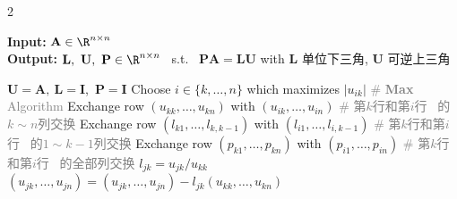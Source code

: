 \documentclass{note}
\newcommand{\codealg}[1]{\textcolor{gray}{\quad \# \textbf{#1} Algorithm}}
\begin{document}
\vspace{-27pt}

\begin{multicols}{2}

\begin{algorithm}[H]
\tiny
\caption*{\textbf{LUPP} LU factorisation with partial pivoting \ps{(not unique)} \vspace{-0.1cm} \quad \ps{$C(n)=\frac{2}{3}n^3+n^2-\frac{5}{3}n$}}
\textbf{Input:} $\mathbf{A}\in\R^{n\times n}$ \\
\textbf{Output:} $\mathbf{L},\ \mathbf{U},\ \mathbf{P}\in\R^{n\times n}$ \ s.t. \ $\mathbf{P}\mathbf{A}=\mathbf{L}\mathbf{U}$ with $\mathbf{L}$ 单位下三角, $\mathbf{U}$ 可逆上三角
\begin{algorithmic}[1]
  \State $\mathbf{U} = \mathbf{A},\ \mathbf{L} = \mathbf{I}$,\ $\mathbf{P} = \mathbf{I}$
    \State Choose $i\in\{k,\dots,n\}$ which maximizes $|u_{ik}|$ \codealg{Max}
    \State Exchange row $(u_{kk}, \dots, u_{kn})$ with $(u_{ik}, \dots, u_{in})$ \textcolor{gray}{\quad \# 第$k$行和第$i$行 \ 的$k\sim n$列交换}
    \State Exchange row $(l_{k1}, \dots, l_{k,k-1})$ with $(l_{i1}, \dots, l_{i,k-1})$ \textcolor{gray}{\quad \# 第$k$行和第$i$行 \ 的$1\sim k-1$列交换}
    \State Exchange row $(p_{k1}, \dots, p_{kn})$ with $(p_{i1}, \dots, p_{in})$ \textcolor{gray}{\quad \# 第$k$行和第$i$行 \ 的全部列交换}
      \State $l_{jk} = u_{jk} / u_{kk}$
      \State $(u_{jk}, \dots, u_{jn}) = (u_{jk}, \dots, u_{jn}) - l_{jk}(u_{kk}, \dots, u_{kn})$
    \EndFor
  \EndFor
\end{algorithmic}
\end{algorithm}


\end{multicols}
\end{document}
